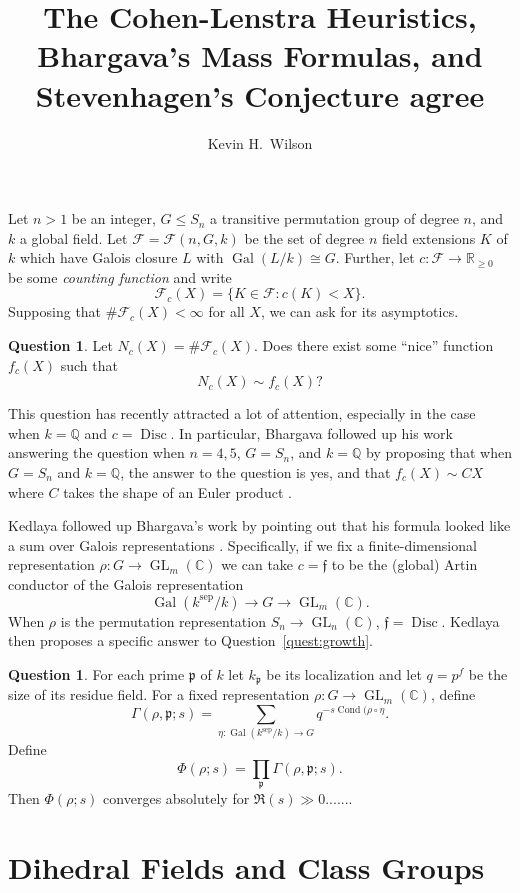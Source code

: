 \documentclass[11pt]{article}
\title{The Cohen-Lenstra Heuristics, Bhargava's Mass Formulas, and Stevenhagen's Conjecture agree}
\author{Kevin H.~Wilson}
\newcommand{\Gal}{\operatorname{Gal}}
\newcommand{\Disc}{\operatorname{Disc}}
\newcommand{\GL}{\operatorname{GL}}
\newcommand{\ksep}{k^{\mathrm{sep}}}
\newcommand{\Cond}{\operatorname{Cond}}
\newcommand{\C}{\mathbb{C}}
\newcommand{\Q}{\mathbb{Q}}
\newcommand{\R}{\mathbb{R}}
\newcommand{\sF}{\mathcal{F}}
\newcommand{\ff}{\mathfrak{f}}
\newcommand{\fp}{\mathfrak{p}}
\theoremstyle{definition}
\newtheorem{question}[lem]{Question}
\begin{document}
Let $n > 1$ be an integer, $G \leq S_n$ a transitive permutation group of
degree $n$, and $k$ a global field. Let $\sF = \sF(n, G, k)$ be the set of
degree $n$ field extensions $K$ of $k$ which have Galois closure $L$ with
$\Gal(L/k) \cong G$. Further, let $c: \sF \to \R_{\geq 0}$ be some {\em
counting function} and write \[ \sF_c(X) = \{ K \in \sF : c(K) < X \}. \]
Supposing that $\# \sF_c(X) < \infty$ for all $X$, we can ask for its
asymptotics.

\begin{question}
  Let $N_c(X) = \# \sF_c(X)$. Does there exist some ``nice'' function $f_c(X)$ such that
  \[ N_c(X) \sim f_c(X)? \]
\end{question}

This question has recently attracted a lot of attention, especially in the case
when $k = \Q$ and $c = \Disc$. In particular, Bhargava followed up his work
answering the question when $n = 4, 5$, $G = S_n$, and $k = \Q$
\cite{BhargavaQuartic, BhargavaQuintic} by proposing that when $G = S_n$ and $k
= \Q$, the answer to the question is yes, and that $f_c(X) \sim CX$ where $C$
takes the shape of an Euler product \cite{BharagavaMass}.

Kedlaya followed up Bhargava's work by pointing out that his formula looked
like a sum over Galois representations \cite{KedlayaMass}. Specifically, if we
fix a finite-dimensional representation $\rho : G \to \GL_m(\C)$ we can take $c
= \ff$ to be the (global) Artin conductor of the Galois representation \[
\Gal(\ksep/k) \to G \to \GL_m(\C). \] When $\rho$ is the permutation
representation $S_n \to \GL_n(\C)$, $\ff = \Disc$. Kedlaya then proposes a
specific answer to Question~\ref{quest:growth}.

\begin{question}
  For each prime $\fp$ of $k$ let $k_\fp$ be its localization and let $q = p^f$ be the size of its residue field. For a fixed representation $\rho : G \to \GL_m(\C)$, define
  \[ \Gamma(\rho, \fp; s) = \sum_{\eta: \Gal(\ksep/k) \to G} q^{-s\Cond(\rho \circ \eta}. \]
  Define
  \[ \Phi(\rho; s) = \prod_{\fp} \Gamma(\rho, \fp; s). \]
  Then $\Phi(\rho; s)$ converges absolutely for $\Re(s) \gg 0$.......
\end{question}





\section{Dihedral Fields and Class Groups}
\end{document}
